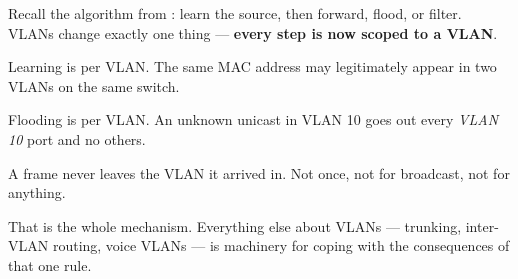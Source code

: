 \begin{conceptbox}
Recall the algorithm from : learn the source, then forward,
flood, or filter. VLANs change exactly one thing --- \textbf{every step is now
scoped to a VLAN}.

\begin{tight}
  \item Learning is per VLAN. The same MAC address may legitimately appear in two
        VLANs on the same switch.
  \item Flooding is per VLAN. An unknown unicast in VLAN 10 goes out every
        \emph{VLAN 10} port and no others.
  \item A frame never leaves the VLAN it arrived in. Not once, not for broadcast,
        not for anything.
\end{tight}
That is the whole mechanism. Everything else about VLANs --- trunking,
inter-VLAN routing, voice VLANs --- is machinery for coping with the consequences
of that one rule.
\end{conceptbox}

